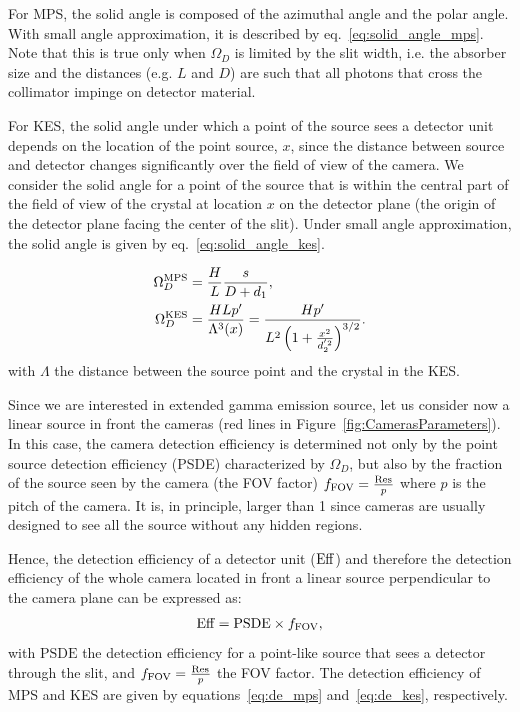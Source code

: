 \documentclass[a4paper,english,12pt]{article}
\begin{document}
For MPS, the solid angle is composed of the azimuthal angle and the polar angle. With small angle approximation, it is described by
eq.~\ref{eq:solid_angle_mps}. Note that this is true only when $\Omega_D$ is
limited by the slit width, i.e. the absorber size and the distances (e.g. $L$ and $D$) are such that
all photons that cross the collimator impinge on detector material. 

For KES, the solid angle under which a point of the source sees a detector unit depends on the location of the point source, $x$, since the distance between source and detector changes significantly over the field of view of the camera. We
consider the solid angle for a point of the source that is within the central
part of the field of view of the crystal at location $x$ on the detector plane
(the origin of the detector plane facing the center of the slit). Under small
angle approximation, the solid angle is given by eq.~\ref{eq:solid_angle_kes}. 

\begin{align}  
  \Omega_D^{\textrm{MPS}} & = \frac{H}{L} \frac{s}{D+d_1} \label{eq:solid_angle_mps}, \\
	\Omega_D^{\textrm{KES}} & = \frac{H L p'}{\Lambda^3(x)} =  \frac{H p'}{L^2 \left( 1+\frac{x^2}{d_2^{'2}} \right)^{3/2}}. \label{eq:solid_angle_kes} 
\end{align}
with $\Lambda$ the distance between the source point and the crystal in the KES.


Since we are interested in extended gamma emission source, let us consider now a linear source in front the cameras (red lines in Figure~\ref{fig:CamerasParameters}). In this case, the camera detection efficiency is determined not only by the point source detection efficiency (PSDE) characterized by $\Omega_D$, but also by the fraction of the source seen by the camera (the FOV factor) $f_{\textrm{FOV}} = \frac{\textrm{Res}_{}}{p}$ where $p$ is the pitch of the camera. It is, in principle, larger than 1 since cameras are usually designed to see all the source without any hidden regions.

Hence, the detection efficiency of a detector unit ($\textrm{Eff}_{}$) and therefore the detection efficiency of the whole camera located in front a linear source perpendicular to  the camera plane can be expressed as:
\begin{align} 
	\textrm{Eff}_{} = \textrm{PSDE} \times f_{\textrm{FOV}},
\end{align}
with $\textrm{PSDE}$ the detection efficiency for a point-like source that sees a detector through the slit, and $f_{\textrm{FOV}} = \frac{\textrm{Res}_{}}{p}$ the FOV factor. The detection efficiency of MPS and KES are given by equations~\ref{eq:de_mps} and~\ref{eq:de_kes}, respectively.
\end{document}
